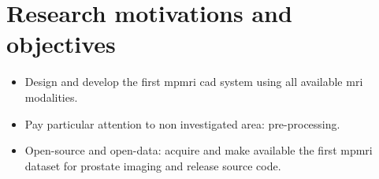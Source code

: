 \section{Research motivations and objectives}\label{sec:intro:motivation}



\begin{itemize}
\item Design and develop the first \ac{mpmri} \ac{cad} system using all available \ac{mri} modalities.
\item Pay particular attention to non investigated area: pre-processing.
\item Open-source and open-data: acquire and make available the first \ac{mpmri} dataset for prostate imaging and release source code.
\end{itemize}
